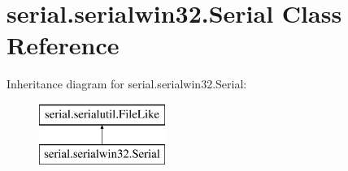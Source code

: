 \hypertarget{classserial_1_1serialwin32_1_1_serial}{\section{serial.\-serialwin32.\-Serial Class Reference}
\label{classserial_1_1serialwin32_1_1_serial}
}
Inheritance diagram for serial.\-serialwin32.\-Serial\-:\begin{figure}[H]
\begin{center}
\leavevmode
\includegraphics[height=2.000000cm]{classserial_1_1serialwin32_1_1_serial}
\end{center}
\end{figure}
